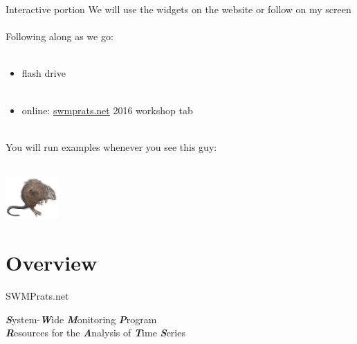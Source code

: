 \documentclass[xcolor=dvipsnames,serif]{beamer}\usepackage[]{graphicx}\usepackage[]{color}
\newcommand{\Bigtxt}[1]{\textbf{\textit{#1}}}
\begin{document}
\begin{frame}{Interactive portion}
\onslide<+->
We will use the widgets on the website or follow on my screen\\~\\
Following along as we go: \\~\\
\begin{itemize}
\item flash drive\\~\\
\item online: \href{http://swmprats.net/}{swmprats.net} 2016 workshop tab \\~\\
\end{itemize}
\onslide<+->
You will run examples whenever you see this guy: \\~\\
\centerline{\includegraphics[width = 0.15\textwidth]{imgs/swmprat.png}} 
\end{frame}

\section{Overview}

\begin{frame}{SWMPrats.net}
\centerline{}
\vspace{0.2in}
\Large
\Bigtxt{S}ystem-\Bigtxt{W}ide \Bigtxt{M}onitoring \Bigtxt{P}rogram \\
\hspace{0.5in} \Bigtxt{R}esources for the \Bigtxt{A}nalysis of \Bigtxt{T}ime \Bigtxt{S}eries \\~\\
\normalsize
\end{frame}
\end{document}
